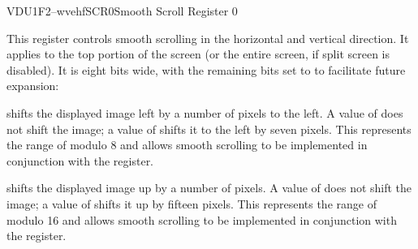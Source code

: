


\begin{ioport}{VDU}{1F2}{--wvehf}{SCR0}{Smooth Scroll Register 0}

  This register controls smooth scrolling in the horizontal and vertical
  direction. It applies to the top portion of the screen (or the entire screen,
  if split screen is disabled). It is eight bits wide, with the remaining bits
  set to  to facilitate future expansion:

  \begin{cbitfield}[8]
  \end{cbitfield}

  \begin{description}
     shifts the displayed image left by a number of
    pixels to the left. A value of  does not shift the image; a value of
     shifts it to the left by seven pixels. This represents the range of
    modulo 8 and allows smooth scrolling to be implemented in conjunction with
    the  register.

     shifts the displayed image up by a number of pixels. A
    value of  does not shift the image; a value of  shifts it up
    by fifteen pixels. This represents the range of modulo 16 and allows smooth
    scrolling to be implemented in conjunction with the  register.
  \end{description}

\end{ioport}





